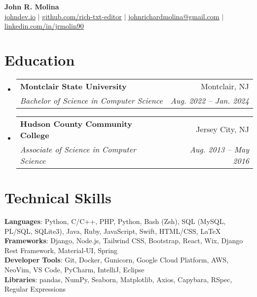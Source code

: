 \documentclass[letterpaper,11pt]{article}
\makeatletter
\newcommand{\resumeSubheading}[4]{
  \vspace{-2pt}\item
    \begin{tabular*}{0.97\textwidth}[t]{l@{\extracolsep{\fill}}r}
      \textbf{#1} & #2 \\
      \textit{\small#3} & \textit{\small #4} \\
    \end{tabular*}\vspace{-7pt}
}
\newcommand{\resumeSubHeadingListStart}{\begin{itemize}[leftmargin=0.15in, label={}]}
\newcommand{\resumeSubHeadingListEnd}{\end{itemize}}
\makeatother
\begin{document}

\begin{center}
    \textbf{\Huge John R. Molina} \\ \vspace{1pt}
    \small \href{https://www.johndev.io}{\underline{johndev.io}} $|$
    \href{https://github.com/rich-txt-editor}{\underline{github.com/rich-txt-editor}} $|$
    \href{mailto:johnrichardmolina@gmail.com}{\underline{johnrichardmolina@gmail.com}} $|$
    \href{https://linkedin.com/in/jrmolin90}{\underline{linkedin.com/in/jrmolin90}}
  \end{center}


\section{Education}
  \resumeSubHeadingListStart
    \resumeSubheading
      {Montclair State University}{Montclair, NJ}
      {Bachelor of Science in Computer Science}{Aug. 2022 -- Jan. 2024}
    \resumeSubheading
      {Hudson County Community College}{Jersey City, NJ}
      {Associate of Science in Computer Science }{Aug. 2013 -- May 2016}
  \resumeSubHeadingListEnd

%




\section{Technical Skills}
 \begin{itemize}[leftmargin=0.15in, label={}]
    \small{\item{
     \textbf{Languages}{: Python, C/C++, PHP, Python, Bash (Zsh), SQL (MySQL, PL/SQL, SQLite3), Java, Ruby, JavaScript, Swift, HTML/CSS, LaTeX} \\
     \textbf{Frameworks}{: Django, Node.js, Tailwind CSS, Bootstrap, React, Wix, Django Rest Framework, Material-UI, Spring} \\
     \textbf{Developer Tools}{: Git, Docker, Gunicorn, Google Cloud Platform, AWS, NeoVim,  VS Code, PyCharm, IntelliJ, Eclipse} \\
     \textbf{Libraries}{: pandas, NumPy, Seaborn, Matplotlib, Axios, Capybara, RSpec, Regular Expressions}
    }}
 \end{itemize}
\end{document}
